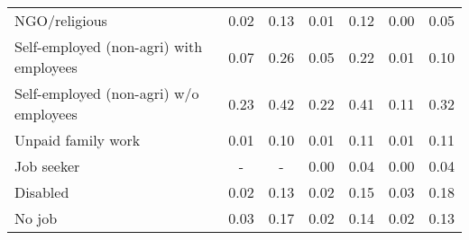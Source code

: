 \begin{table}[htbp]
\begin{tabulary}{1 \textwidth}{Lcccccc}
     NGO/religious &                     0.02  &                     0.13  &                     0.01  &                     0.12  &                      0.00  &                 0.05  \\
     Self-employed (non-agri) with employees &                     0.07  &                     0.26  &                     0.05  &                     0.22  &                      0.01  &                 0.10  \\
     Self-employed (non-agri) w/o employees &                     0.23  &                     0.42  &                     0.22  &                     0.41  &                      0.11  &                 0.32  \\
     Unpaid family work &                     0.01  &                     0.10  &                     0.01  &                     0.11  &                      0.01  &                 0.11  \\
    Job seeker &                          -    &                          -    &                     0.00  &                     0.04  &                      0.00  &                 0.04  \\
     
     Disabled  &                     0.02  &                     0.13  &                     0.02  &                     0.15  &                      0.03  &                 0.18  \\
     No job &                     0.03  &                     0.17  &                     0.02  &                     0.14  &                      0.02  &                 0.13  \\
    \bottomrule
    \end{tabulary}%
    \label{tab:addlabel}%

\end{table}%
